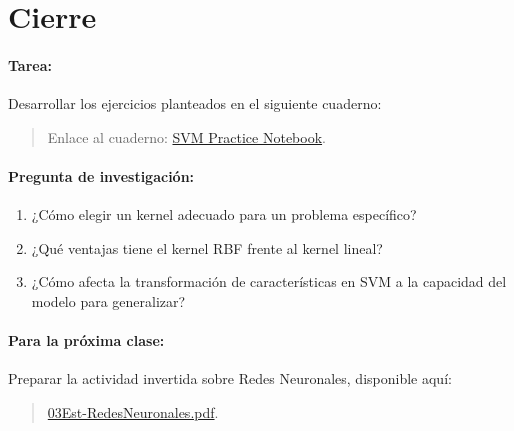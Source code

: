 \documentclass[a4,11pt]{aleph-notas}
\begin{document}
\section*{Cierre}  

\paragraph{Tarea:}  
Desarrollar los ejercicios planteados en el siguiente cuaderno:  
\begin{quote}  
    Enlace al cuaderno: \href{https://example.com/svm_practice}{SVM Practice Notebook}.  
\end{quote}  

\paragraph{Pregunta de investigación:}  
\begin{enumerate}[leftmargin=*]  
    \item ¿Cómo elegir un kernel adecuado para un problema específico?  
    \item ¿Qué ventajas tiene el kernel RBF frente al kernel lineal?  
    \item ¿Cómo afecta la transformación de características en SVM a la capacidad del modelo para generalizar?  
\end{enumerate}  

\paragraph{Para la próxima clase:}  
Preparar la actividad invertida sobre Redes Neuronales, disponible aquí:  
\begin{quote}  
    \href{https://andres-merino.github.io/AprendizajeAutomaticoInicial-05-N0105/2-ClaseInvertida/03Est-RedesNeuronales.pdf}{03Est-RedesNeuronales.pdf}.  
\end{quote}  
\end{document}
